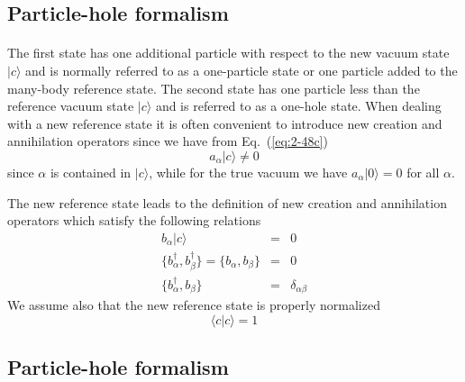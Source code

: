\documentclass[%
twoside,                 %
final,                   %
10pt]{article}
\begin{document}
\subsection*{Particle-hole formalism}

\paragraph{}
The first state has one additional particle with respect to the new vacuum state
$|c\rangle $  and is normally referred to as a one-particle state or one particle added to the 
many-body reference state. 
The second state has one particle less than the reference vacuum state  $|c\rangle $ and is referred to as
a one-hole state. 
When dealing with a new reference state it is often convenient to introduce 
new creation and annihilation operators since we have 
from Eq.~(\ref{eq:2-48c})
\begin{equation}
	a_\alpha |c\rangle  \neq 0 \label{eq:2-49}
\end{equation}
since  $\alpha$ is contained  in $|c\rangle $, while for the true vacuum we have 
$a_\alpha |0\rangle  = 0$ for all $\alpha$.

The new reference state leads to the definition of new creation and annihilation operators
which satisfy the following relations
\begin{eqnarray}
	b_\alpha |c\rangle  &=& 0 \label{eq:2-50a} \\
	\{b_\alpha^\dagger , b_\beta^\dagger \} = \{b_\alpha , b_\beta \} &=& 0 \nonumber  \\
	\{b_\alpha^\dagger , b_\beta \} &=& \delta_{\alpha \beta} \label{eq:2-50c}
\end{eqnarray}
We assume also that the new reference state is properly normalized
\begin{equation}
	\langle c | c \rangle = 1 \label{eq:2-51}
\end{equation}



\subsection*{Particle-hole formalism}

\end{document}
